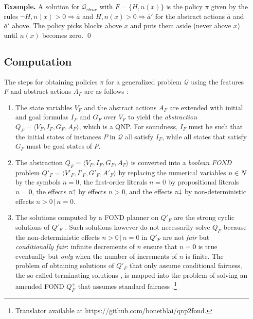\documentclass[letterpaper]{article} %
\newcommand{\tup}[1]{\langle #1 \rangle}
\newenvironment{example}{\noindent\textbf{Example.}\xspace}{\qed}
\newcommand{\Q}{\mathcal{Q}}
\newcommand{\Rule}[2]{\ensuremath{#1 \Rightarrow #2}}
\newcommand{\pplus}{\hspace{-.05em}\raisebox{.15ex}{\footnotesize$\uparrow$}}
\newcommand{\mminus}{\hspace{-.05em}\raisebox{.15ex}{\footnotesize$\downarrow$}}
\begin{document}
\medskip
\begin{example}
  A solution for $\Q_{clear}$ with   $F=\{H,n(x)\}$ is the policy $\pi$ given by the rules
  $\Rule{\neg H, n(x)>0}{\bar{a}}$ and $\Rule{H, n(x)>0}{\bar{a}'}$
  for the abstract actions $\bar{a}$ and $\bar{a}'$ above.
  The policy picks blocks above $x$ and puts them aside (never  above $x$)
  until $n(x)$ becomes zero.
\end{example}


\subsection{Computation}

The steps for obtaining policies $\pi$ for a generalized problem $\Q$
using the features $F$ and abstract actions $A_F$ are as follows \cite{bonet:ijcai2018}:

\begin{enumerate}[1.]
  \item The state variables $V_F$ and the abstract actions $A_F$ are
    extended with initial and goal formulas $I_F$ and $G_F$ over $V_F$
    to yield the \emph{abstraction}  $Q_F=\tup{V_F,I_F,G_F,A_F}$,
    which is a QNP. For soundness, $I_F$ must be such that
    the initial states of instances $P$ in $\Q$ all satisfy $I_F$, while
    all states that satisfy $G_F$ must be goal states of $P$.
%
  \item The abstraction $Q_F=\tup{V_F,I_F,G_F,A_F}$ is converted into a
    \emph{boolean FOND} problem $Q'_F=\tup{V'_F,I'_F,G'_F,A'_F}$ by
    replacing the numerical variables $n\in N$ by the symbols $n=0$,
    the first-order literals $n=0$ by propositional literals  $n=0$,
    the effects $n\pplus$ by effects $n > 0$, and the
    effects $n\mminus$ by non-deterministic effects $n>0\,|\,n=0$.
%
  \item The solutions computed by a FOND planner on $Q'_F$ are the
    strong cyclic solutions of $Q'_F$ \cite{strong-cyclic}.
    Such solutions however do not necessarily solve $Q_F$ because the
    non-deterministic effects $n>0\,|\,n=0$ in $Q'_F$ are not \emph{fair} but
    \emph{conditionally fair}: infinite decrements of $n$ ensure that
    $n=0$ is true eventually but \emph{only} when  the number of increments of $n$ is finite.
    The problem of obtaining solutions of $Q'_F$ that only assume conditional
    fairness, the so-called terminating solutions \cite{srivastava:aaai2011},
    is mapped into the problem of solving an amended FOND $Q^+_F$ that
    assumes standard  fairness \cite{bonet:ijcai2017}.\footnote{Translator
    available at https://github.com/bonetblai/qnp2fond.}
\end{enumerate}
\end{document}
